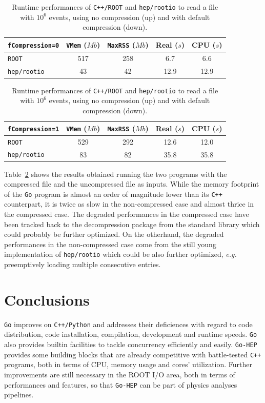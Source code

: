 \documentclass[a4paper]{jpconf}
\begin{document}
\begin{table}[h]
\begin{center}
  \begin{tabular}{ l | c | c | c | c }
	  \texttt{fCompression=0} & \texttt{VMem} ($Mb$) & \texttt{MaxRSS} ($Mb$) & Real ($s$) & CPU ($s$) \\
    \hline
	   \texttt{ROOT} & 517 & 258 & 6.7 & 6.6 \\
	   \texttt{hep/rootio} & 43 & 42 & 12.9 & 12.9 \\
    \hline
  \end{tabular}
\end{center}

\begin{center}
  \begin{tabular}{ l | c | c | c | c }
	  \texttt{fCompression=1} & \texttt{VMem} ($Mb$) & \texttt{MaxRSS} ($Mb$) & Real ($s$) & CPU ($s$) \\
    \hline
	   \texttt{ROOT} & 529 & 292 & 12.6 & 12.0 \\
	   \texttt{hep/rootio} & 83 & 82 & 35.8 & 35.8 \\
    \hline
  \end{tabular}
	\caption{\label{fig-rootio-perf-tab}Runtime performances of \texttt{C++/ROOT} and \texttt{hep/rootio} to read a file with $10^6$ events, using no compression (up) and with default compression (down).}
\end{center}
\end{table}

Table~\ref{fig-rootio-perf-tab} shows the results obtained running the two programs with the compressed file and the uncompressed file as inputs.
While the memory footprint of the \texttt{Go} program is almost an order of magnitude lower than its \texttt{C++} counterpart, it is twice as slow in the non-compressed case and almost thrice in the compressed case.
The degraded performances in the compressed case have been tracked back to the decompression package from the standard library which could probably be further optimized.
On the otherhand, the degraded performances in the non-compressed case come from the still young implementation of \texttt{hep/rootio} which could be also further optimized, \emph{e.g.} preemptively loading multiple consecutive entries.

\section{Conclusions}

\texttt{Go} improves on \texttt{C++/Python} and addresses their deficiences with regard to code distribution, code installation, compilation, development and runtime speeds.
\texttt{Go} also provides builtin facilities to tackle concurrency efficiently and easily.
\texttt{Go-HEP} provides some building blocks that are already competitive with battle-tested \texttt{C++} programs, both in terms of CPU, memory usage and cores' utilization.
Further improvements are still necessary in the ROOT I/O area, both in terms of performances and features, so that \texttt{Go-HEP} can be part of physics analyses pipelines.
\end{document}
